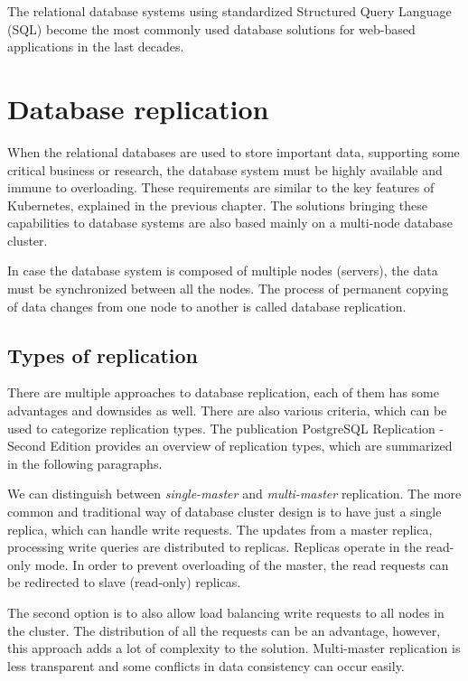 \documentclass[
  digital, %
  twoside, %
  table,   %
  nolof,   %
  nolot,   %
]{fithesis3}
\begin{document}
The relational database systems using standardized Structured Query Language (SQL) \cite{sql_standard} become the most commonly used database solutions for web-based applications in the last decades.

\section{Database replication} \label{sec:db_replication}
When the relational databases are used to store important data, supporting some critical business or research, the database system must be highly available and immune to overloading. These requirements are similar to the key features of Kubernetes, explained in the previous chapter. The solutions bringing these capabilities to database systems are also based mainly on a multi-node database cluster.

In case the database system is composed of multiple nodes (servers), the data must be synchronized between all the nodes. The process of permanent copying of data changes from one node to another is called database replication.

\subsection{Types of replication} \label{sec:types_of_replication}
There are multiple approaches to database replication, each of them has some advantages and downsides as well. There are also various criteria, which can be used to categorize replication types. The publication PostgreSQL Replication - Second Edition \cite{pg} provides an overview of replication types, which are summarized in the following paragraphs.

We can distinguish between \textit{single-master} and  \textit{multi-master} replication. The more common and traditional way of database cluster design is to have just a single replica, which can handle write requests. The updates from a master replica, processing write queries are distributed to replicas. Replicas operate in the read-only mode. In order to prevent overloading of the master, the read requests can be redirected to slave (read-only) replicas.

The second option is to also allow load balancing write requests to all nodes in the cluster. The distribution of all the requests can be an advantage, however, this approach adds a lot of complexity to the solution. Multi-master replication is less transparent and some conflicts in data consistency can occur easily.
\end{document}
